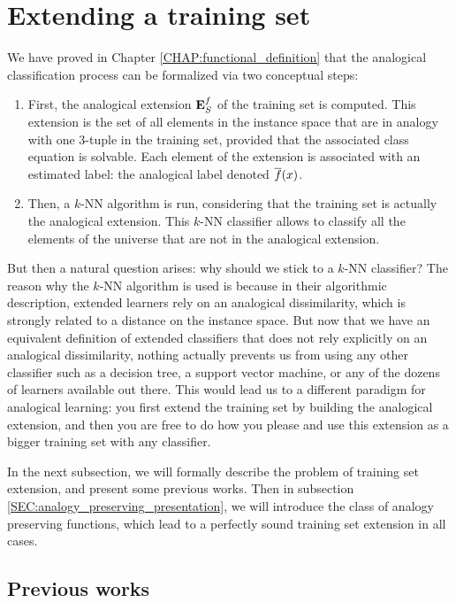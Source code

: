 \section{Extending a training set}

We have proved in Chapter \ref{CHAP:functional_definition} that the analogical
classification process can be formalized via two conceptual steps:
\begin{enumerate}
  \item First, the analogical extension $\mathbf{E}_{S}^{f}$ of the training set is computed. This
    extension is the set of all elements in the instance space that are in
    analogy with one $3$-tuple in the training set, provided that the
    associated class equation is solvable. Each element of the extension is
    associated with an estimated label: the analogical label denoted $\overline{f}(x)$.
  \item Then, a $k$-NN algorithm is run, considering that the training set is
    actually the analogical extension. This $k$-NN classifier allows to
    classify all the elements of the universe that are not in the analogical
    extension.
\end{enumerate}

But then a natural question arises: why should we stick to a $k$-NN classifier?
The reason why the $k$-NN algorithm is used is because in their algorithmic
description, extended learners rely on an analogical dissimilarity, which is
strongly related to a distance on the instance space. But now that we have an
equivalent definition of extended classifiers that does not rely explicitly on
an analogical dissimilarity, nothing actually prevents us from using any other
classifier such as a decision tree, a support vector machine, or any of the
dozens of learners available out there. This would lead us to a different
paradigm for analogical learning: you first extend the training set by building
the analogical extension, and then you are free to do how you please and use
this extension as a bigger training set with any classifier.

In the next subsection, we will formally describe the problem of training set
extension, and present some previous works. Then in subsection
\ref{SEC:analogy_preserving_presentation}, we will introduce the class of
analogy preserving functions, which lead to a perfectly sound training set
extension in all cases.

\subsection{Previous works}

